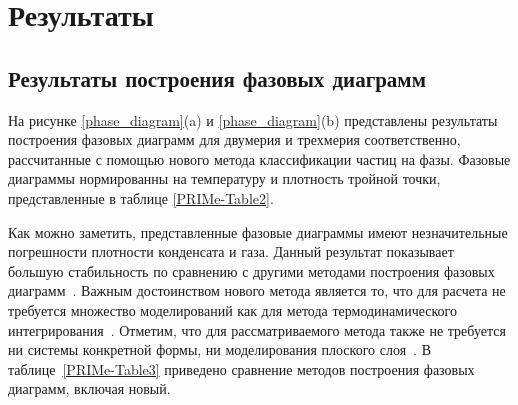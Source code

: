 \section{Результаты}
\label{PRIMe-SecResults}

\subsection{Результаты построения фазовых диаграмм}
\label{PRIMe-SubSecPhaseDiagramMD}

На рисунке \ref{phase_diagram}(a) и \ref{phase_diagram}(b) представлены результаты построения фазовых диаграмм для двумерия и трехмерия соответственно, рассчитанные с помощью нового метода классификации частиц на фазы.
Фазовые диаграммы нормированны на температуру и плотность тройной точки, представленные в таблице \ref{PRIMe-Table2}.

Как можно заметить, представленные фазовые диаграммы имеют незначительные погрешности плотности конденсата и газа.
Данный результат показывает большую стабильность по сравнению с другими методами построения фазовых диаграмм~\cite{10.1021/jp806127j, 10.1021/jp1117213}.
Важным достоинством нового метода является то, что для расчета не требуется множество моделирований как для метода термодинамического интегрирования~\cite{10.1080/00268976.2019.1699185}. Отметим, что для рассматриваемого метода также не требуется ни системы конкретной формы, ни моделирования плоского слоя~\cite{10.1021/jp806127j, 10.1021/jp1117213}.
В таблице~\ref{PRIMe-Table3} приведено сравнение методов построения фазовых диаграмм, включая новый.



\begin{table}[h!]
  \caption{Сравнение различных методов построения фазовых диаграмм.
    Под 2D и 3D понимается применимость данных методов в двумерных или трехмерных системах, под скоростью -- величина затраченого времени в человеко-часах на одну точку фазовой диаграммы относительно других представленных методов, под точностью -- точность метода относительно других представленных методов.}
  \label{PRIMe-Table3}
\end{table}



